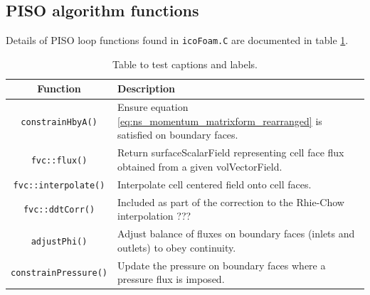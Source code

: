 \documentclass[a4paper,11pt]{report}
\begin{document}
\subsection{PISO algorithm functions}
Details of PISO loop functions found in \texttt{icoFoam.C} are documented in table \ref{table:piso_loop_functions}.
\begin{table}[ht]
\begin{center}
\begin{tabularx}{\textwidth}{ c | p{105mm} }
    Function & Description \\
    \hline\hline
    \texttt{constrainHbyA()} & Ensure equation \ref{eq:ns_momentum_matrixform_rearranged} is satisfied on boundary faces.\\
    \hline
    \texttt{fvc::flux()} & Return surfaceScalarField representing cell face flux obtained from a given volVectorField. \\
    \hline
    \texttt{fvc::interpolate()} & Interpolate cell centered field onto cell faces. \\
    \hline
    \texttt{fvc::ddtCorr()} & Included as part of the correction to the Rhie-Chow interpolation \cite{Rhie1983}???\\
    \hline
    \texttt{adjustPhi()} & Adjust balance of fluxes on boundary faces (inlets and outlets) to obey continuity. \\
    \hline
    \texttt{constrainPressure()} & Update the pressure on boundary faces where a pressure flux is imposed. \\
\end{tabularx}
\end{center}
\caption{Table to test captions and labels.}
\label{table:piso_loop_functions}
\end{table}\\
\end{document}
